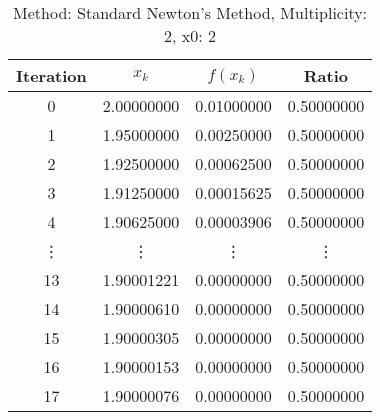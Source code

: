 \begin{table}
\centering
\caption{Method: Standard Newton's Method, Multiplicity: 2, x0: 2}
\label{tab:table_Standard_Newton's_Method_2_2}
\begin{tabular}{c c c c}
\toprule
Iteration &      $x_k$ &   $f(x_k)$ &      Ratio \\
\midrule
        0 & 2.00000000 & 0.01000000 & 0.50000000 \\
        1 & 1.95000000 & 0.00250000 & 0.50000000 \\
        2 & 1.92500000 & 0.00062500 & 0.50000000 \\
        3 & 1.91250000 & 0.00015625 & 0.50000000 \\
        4 & 1.90625000 & 0.00003906 & 0.50000000 \\
   \vdots &     \vdots &     \vdots &     \vdots \\
       13 & 1.90001221 & 0.00000000 & 0.50000000 \\
       14 & 1.90000610 & 0.00000000 & 0.50000000 \\
       15 & 1.90000305 & 0.00000000 & 0.50000000 \\
       16 & 1.90000153 & 0.00000000 & 0.50000000 \\
       17 & 1.90000076 & 0.00000000 & 0.50000000 \\
\bottomrule
\end{tabular}
\end{table}
